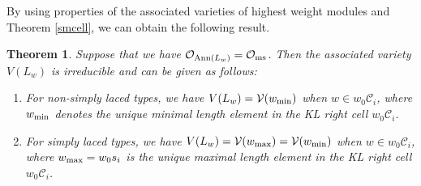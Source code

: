 \documentclass[11pt, reqno]{amsart}
\renewcommand{\subset}{\subseteq}
\newtheorem{Thm}{Theorem}[section]
\theoremstyle{definition}
\numberwithin{equation}{section}
\begin{document}






 

By using properties of the associated varieties of highest weight modules and Theorem \ref{smcell}, we can obtain the following result.




\begin{Thm}\label{AV-min}
Suppose that we have $\mathcal{O}_{{\rm Ann}(L_w)}=\mathcal{O}_{{\rm ms}}$.
Then the associated variety $V(L_w)$ is irreducible and can be given as follows:
\begin{enumerate}
   \item For non-simply laced types,  we have $V(L_w)=\mathcal{V}(w_{\rm min})$ when $w\in w_0\mathcal{C}_i$, where $w_{\rm min}$ denotes the unique minimal length element in the KL right cell $w_0\mathcal{C}_i$.
   
 \item For simply laced types, we have $V(L_w)=\mathcal{V}(w_{\rm max})=\mathcal{V}(w_{\rm min})$ when $w\in w_0\mathcal{C}_i$, where $w_{\rm max}=w_0s_i$ is the unique maximal length  element  in the KL right cell $w_0\mathcal{C}_i$.
  
\end{enumerate}

\end{Thm}
\end{document}
